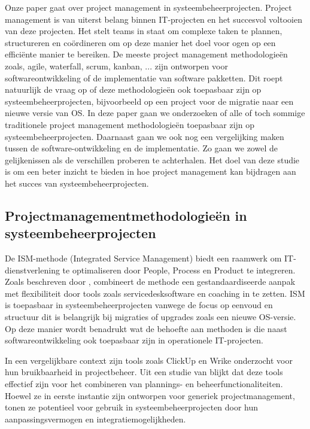 \documentclass{article}
\begin{document}
    Onze paper gaat over project management in systeembeheerprojecten. 
    Project management is van uiterst belang binnen IT-projecten en het succesvol voltooien van deze projecten. 
    Het stelt teams in staat om complexe taken te plannen, structureren en coördineren om op deze manier het doel voor ogen op een efficiënte manier te bereiken. \newline
    De meeste project management methodologieën zoals, agile, waterfall, scrum, kanban, ... zijn ontworpen voor softwareontwikkeling of de implementatie van software pakketten.
    Dit roept natuurlijk de vraag op of deze methodologieën ook toepasbaar zijn op systeembeheerprojecten, bijvoorbeeld op een project voor de migratie naar een nieuwe versie van OS. \newline
    In deze paper gaan we onderzoeken of alle of toch sommige traditionele project management methodologieën toepasbaar zijn op systeembeheerprojecten.
    Daarnaast gaan we ook nog een vergelijking maken tussen de software-ontwikkeling en de implementatie.
    Zo gaan we zowel de gelijkenissen als de verschillen proberen te achterhalen. \newline
    Het doel van deze studie is om een beter inzicht te bieden in hoe project management kan bijdragen aan het succes van systeembeheerprojecten. 

    \subsection{Projectmanagementmethodologieën in systeembeheerprojecten}

    De ISM-methode (Integrated Service Management) biedt een raamwerk om IT-dienstverlening te optimaliseren door People, Process en Product te integreren. 
    Zoals beschreven door \textcite{hoving2010ism}, combineert de methode een gestandaardiseerde aanpak met flexibiliteit door tools zoals servicedesksoftware en coaching in te zetten.
    ISM is toepasbaar in systeembeheerprojecten vanwege de focus op eenvoud en structuur dit is belangrijk bij migraties of upgrades zoals een nieuwe OS-versie. 
    Op deze manier wordt benadrukt wat de behoefte aan methoden is die naast softwareontwikkeling ook toepasbaar zijn in operationele IT-projecten. \newline

    In een vergelijkbare context zijn tools zoals ClickUp en Wrike onderzocht voor hun bruikbaarheid in projectbeheer. 
    Uit een studie van \textcite{pasaric2022comparison} blijkt dat deze tools effectief zijn voor het combineren van plannings- en beheerfunctionaliteiten. 
    Hoewel ze in eerste instantie zijn ontworpen voor generiek projectmanagement, tonen ze potentieel voor gebruik in systeembeheerprojecten door hun aanpassingsvermogen en integratiemogelijkheden.
\end{document}
